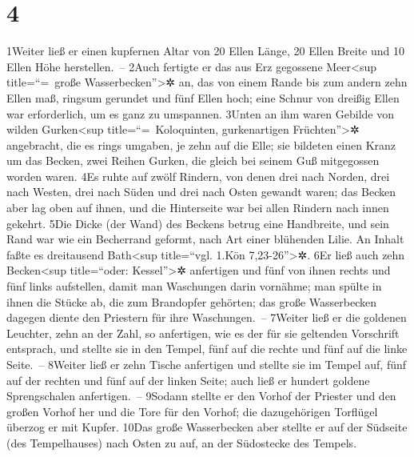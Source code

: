 \hypertarget{section-3}{%
\section{4}\label{section-3}}

1Weiter ließ er einen kupfernen Altar von 20 Ellen Länge, 20 Ellen
Breite und 10 Ellen Höhe herstellen.~-- 2Auch fertigte er das aus Erz
gegossene Meer\textless sup title=``=~große Wasserbecken''\textgreater✲
an, das von einem Rande bis zum andern zehn Ellen maß, ringsum gerundet
und fünf Ellen hoch; eine Schnur von dreißig Ellen war erforderlich, um
es ganz zu umspannen. 3Unten an ihm waren Gebilde von wilden
Gurken\textless sup title=``=~Koloquinten, gurkenartigen
Früchten''\textgreater✲ angebracht, die es rings umgaben, je zehn auf
die Elle; sie bildeten einen Kranz um das Becken, zwei Reihen Gurken,
die gleich bei seinem Guß mitgegossen worden waren. 4Es ruhte auf zwölf
Rindern, von denen drei nach Norden, drei nach Westen, drei nach Süden
und drei nach Osten gewandt waren; das Becken aber lag oben auf ihnen,
und die Hinterseite war bei allen Rindern nach innen gekehrt. 5Die Dicke
(der Wand) des Beckens betrug eine Handbreite, und sein Rand war wie ein
Becherrand geformt, nach Art einer blühenden Lilie. An Inhalt faßte es
dreitausend Bath\textless sup title=``vgl. 1.Kön 7,23-26''\textgreater✲.
6Er ließ auch zehn Becken\textless sup title=``oder:
Kessel''\textgreater✲ anfertigen und fünf von ihnen rechts und fünf
links aufstellen, damit man Waschungen darin vornähme; man spülte in
ihnen die Stücke ab, die zum Brandopfer gehörten; das große Wasserbecken
dagegen diente den Priestern für ihre Waschungen.~-- 7Weiter ließ er die
goldenen Leuchter, zehn an der Zahl, so anfertigen, wie es der für sie
geltenden Vorschrift entsprach, und stellte sie in den Tempel, fünf auf
die rechte und fünf auf die linke Seite.~-- 8Weiter ließ er zehn Tische
anfertigen und stellte sie im Tempel auf, fünf auf der rechten und fünf
auf der linken Seite; auch ließ er hundert goldene Sprengschalen
anfertigen.~-- 9Sodann stellte er den Vorhof der Priester und den großen
Vorhof her und die Tore für den Vorhof; die dazugehörigen Torflügel
überzog er mit Kupfer. 10Das große Wasserbecken aber stellte er auf der
Südseite (des Tempelhauses) nach Osten zu auf, an der Südostecke des
Tempels.

